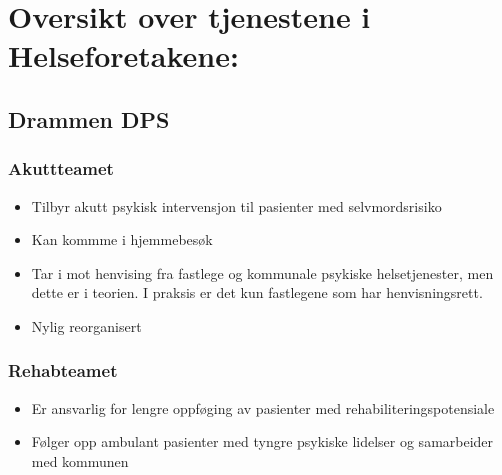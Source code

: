 \documentclass[11pt]{report} %
\begin{document}
                  \section{Oversikt over tjenestene i Helseforetakene:}
                    \subsection{Drammen DPS}\label{sec:org_ddps}
                      \subsubsection{Akuttteamet}\label{sec:org_ddps_akutt}
                          \begin{itemize}
                            \item Tilbyr akutt psykisk intervensjon til pasienter med selvmordsrisiko\\
                            \item Kan kommme i hjemmebesøk\\
                            \item Tar i mot henvising fra fastlege og kommunale psykiske helsetjenester, men dette er i teorien. I praksis er det kun fastlegene som har henvisningsrett.\\
                            \item Nylig reorganisert\\
                          \end{itemize} 
                        \subsubsection{Rehabteamet}\label{sec:org_ddps_rehab}
                          \begin{itemize}
                            \item Er ansvarlig for lengre oppføging av pasienter med rehabiliteringspotensiale\\
                            \item Følger opp ambulant pasienter med tyngre psykiske lidelser og samarbeider med kommunen\\
                          \end{itemize}
\end{document}
